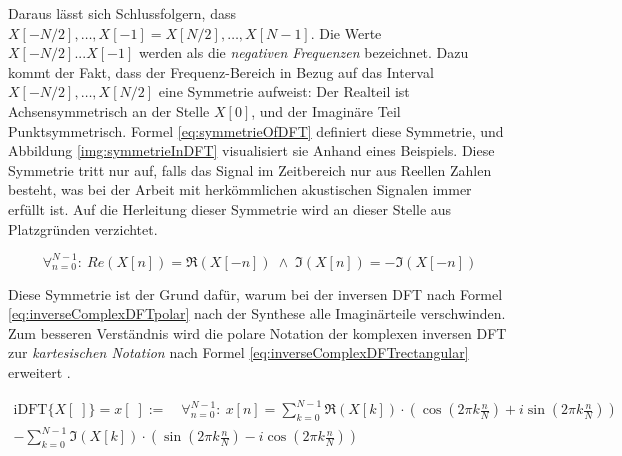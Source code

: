 Daraus lässt sich Schlussfolgern, dass $X[-N/2] ,\ldots, X[-1] = X[N/2] ,\ldots , X[N-1]$. Die Werte $X[-N/2] ... X[-1]$ werden als die \emph{negativen Frequenzen} bezeichnet. Dazu kommt der Fakt, dass der Frequenz-Bereich in Bezug auf das Interval $X[-N/2] ,\ldots, X[N/2]$ eine Symmetrie aufweist: Der Realteil ist Achsensymmetrisch an der Stelle $X[0]$, und der Imaginäre Teil Punktsymmetrisch. Formel \ref{eq:symmetrieOfDFT} definiert diese Symmetrie, und Abbildung \ref{img:symmetrieInDFT} visualisiert sie Anhand eines Beispiels.  Diese Symmetrie tritt nur auf, falls das Signal im Zeitbereich nur aus Reellen Zahlen besteht, was bei der Arbeit mit  herkömmlichen akustischen Signalen immer erfüllt ist. Auf die Herleitung dieser Symmetrie wird an dieser Stelle aus Platzgründen verzichtet. \cite[S. 574]{dspGuide}


\begin{equation}
\label{eq:symmetrieOfDFT}
\mathop{\forall}_{n = 0}^{N-1} :\ Re (X[n]) = \Re(X[-n]) \; \wedge \; \Im (X[n]) = -\Im(X[-n]) 
\end{equation}

Diese Symmetrie ist der Grund dafür, warum bei der inversen DFT nach Formel \ref{eq:inverseComplexDFTpolar} nach der Synthese alle Imaginärteile verschwinden. Zum besseren Verständnis wird die polare Notation der komplexen inversen DFT zur \emph{kartesischen Notation} nach Formel \ref{eq:inverseComplexDFTrectangular} erweitert .\cite[S. 573]{dspGuide}

\begin{equation}
\begin{split}
\text{iDFT}\{X[\;]\} = x[\;] := \quad \mathop{\forall}_{n = 0}^{N-1} :\ x[n] =  \sum_{k = 0}^{N-1}  
\Re(X[k]) \cdot (\cos (2\pi k \frac{n}{N}) + i \sin (2 \pi k \frac{n}{N}) ) \\ 
- \sum_{k = 0}^{N-1}
\Im(X[k]) \cdot (\sin (2\pi k \frac{n}{N}) - i \cos(2 \pi k \frac{n}{N}) )
\end{split}
\label{eq:inverseComplexDFTrectangular}
\end{equation}

